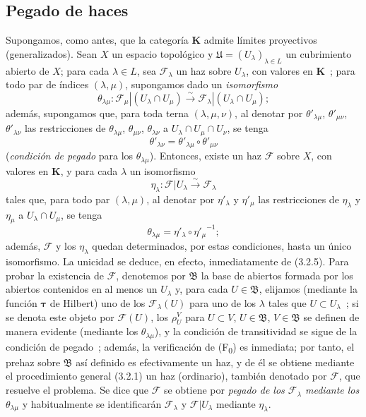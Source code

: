 \subsection{Pegado de haces}
\label{subsection:0.3.3-fr}

\begin{env}[3.3.1]
\label{0.3.3.1-fr}
Supongamos, como antes, que la categoría $\boldsymbol{K}$ admite límites proyectivos
(generalizados). Sean $X$ un espacio topológico y
$\mathfrak{U}=(U_\lambda)_{\lambda\in L}$ un cubrimiento abierto de $X$; para
cada $\lambda\in L$, sea $\mathcal{F}_\lambda$ un haz sobre
$U_\lambda$, con valores en $\boldsymbol{K}$~; para todo par de índices
$(\lambda,\mu)$, supongamos dado un \emph{isomorfismo}
\[
  \theta_{\lambda\mu}:
  \mathcal{F}_\mu|(U_\lambda\cap U_\mu)
  \xrightarrow{\sim}
  \mathcal{F}_\lambda|(U_\lambda\cap U_\mu);
\]
además, supongamos que, para toda terna $(\lambda,\mu,\nu)$, al denotar por
$\theta'_{\lambda\mu}$, $\theta'_{\mu\nu}$, $\theta'_{\lambda\nu}$ las
restricciones de $\theta_{\lambda\mu}$, $\theta_{\mu\nu}$,
$\theta_{\lambda\nu}$ a $U_\lambda\cap U_\mu\cap U_\nu$, se tenga
\[
  \theta'_{\lambda\nu}
  =\theta'_{\lambda\mu}\circ\theta'_{\mu\nu}
\]
(\emph{condición de pegado} para los $\theta_{\lambda\mu}$). Entonces,
existe un haz $\mathcal{F}$ sobre $X$, con valores en $\boldsymbol{K}$, y para
cada $\lambda$ un isomorfismo
\[
  \eta_\lambda:\mathcal{F}|U_\lambda\xrightarrow{\sim}\mathcal{F}_\lambda
\]
tales que, para todo par $(\lambda,\mu)$, al denotar por
$\eta'_\lambda$ y $\eta'_\mu$ las restricciones de $\eta_\lambda$ y
$\eta_\mu$ a $U_\lambda\cap U_\mu$, se tenga
\[
  \theta_{\lambda\mu}=\eta'_\lambda\circ{\eta'_\mu}^{-1};
\]
además, $\mathcal{F}$ y los $\eta_\lambda$ quedan determinados, por estas
condiciones, hasta un único isomorfismo. La unicidad se deduce, en efecto,
inmediatamente de (3.2.5). Para probar la existencia de $\mathcal{F}$, denotemos por
$\mathfrak{B}$ la base de abiertos formada por los abiertos contenidos en al menos un
$U_\lambda$ y, para cada $U\in\mathfrak{B}$, elijamos (mediante la
función $\boldsymbol{\tau}$ de Hilbert) uno de los $\mathcal{F}_\lambda(U)$ para uno de los
$\lambda$ tales que $U\subset U_\lambda$~; si se denota este objeto por
$\mathcal{F}(U)$, los $\rho_U^V$ para $U\subset V$, $U\in\mathfrak{B}$,
$V\in\mathfrak{B}$ se definen de manera evidente (mediante los
$\theta_{\lambda\mu}$), y la condición de transitividad se sigue de la
condición de pegado~; además, la verificación de
(F\textsubscript{0}) es inmediata; por tanto, el prehaz sobre $\mathfrak{B}$
así definido es efectivamente un haz, y de él se obtiene mediante el procedimiento general
(3.2.1) un haz (ordinario), también denotado por $\mathcal{F}$, que resuelve el
problema. Se dice que $\mathcal{F}$ se obtiene por \emph{pegado de los
$\mathcal{F}_\lambda$ mediante los $\theta_{\lambda\mu}$} y habitualmente se identificarán
$\mathcal{F}_\lambda$ y $\mathcal{F}|U_\lambda$ mediante
$\eta_\lambda$.


\end{env}
